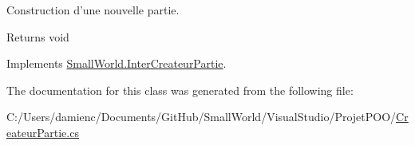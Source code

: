 Construction d'une nouvelle partie. 

\begin{DoxyReturn}{Returns}
void 
\end{DoxyReturn}


Implements \hyperlink{interface_small_world_1_1_inter_createur_partie_a84bc048d2a71699fef54ef531477c917}{Small\-World.\-Inter\-Createur\-Partie}.



The documentation for this class was generated from the following file\-:\begin{DoxyCompactItemize}
\item 
C\-:/\-Users/damienc/\-Documents/\-Git\-Hub/\-Small\-World/\-Visual\-Studio/\-Projet\-P\-O\-O/\hyperlink{_createur_partie_8cs}{Createur\-Partie.\-cs}\end{DoxyCompactItemize}
